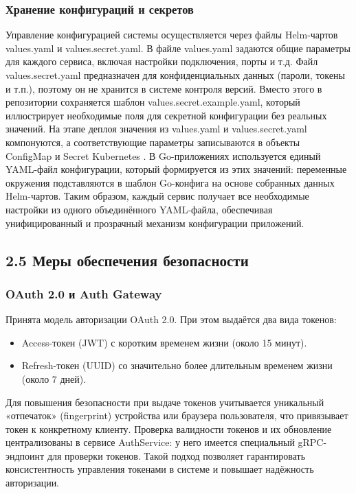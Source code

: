 \subsubsection*{Хранение конфигураций и секретов}
Управление конфигурацией системы осуществляется через файлы Helm-чартов values.yaml и values.secret.yaml. В файле values.yaml задаются общие параметры для каждого сервиса, включая настройки подключения, порты и т.д. Файл values.secret.yaml предназначен для конфиденциальных данных (пароли, токены и т.п.), поэтому он не хранится в системе контроля версий. Вместо этого в репозитории сохраняется шаблон values.secret.example.yaml, который иллюстрирует необходимые поля для секретной конфигурации без реальных значений. На этапе деплоя значения из values.yaml и values.secret.yaml компонуются, а соответствующие параметры записываются в объекты \\ ConfigMap и Secret Kubernetes \cite{3}\cite{4}. В Go-приложениях используется единый YAML-файл конфигурации, который формируется из этих значений: переменные окружения подставляются в шаблон Go-конфига на основе собранных данных Helm-чартов. Таким образом, каждый сервис получает все необходимые настройки из одного объединённого YAML-файла, обеспечивая унифицированный и прозрачный механизм конфигурации приложений.

\subsection*{2.5 Меры обеспечения безопасности}

\subsubsection*{OAuth 2.0 и Auth Gateway}
Принята модель авторизации OAuth 2.0. При этом выдаётся два вида токенов:
\begin{itemize}
    \item Access-токен (JWT) \cite{7} с коротким временем жизни (около 15 минут).
    \item Refresh-токен (UUID) со значительно более длительным временем жизни (около 7 дней).
\end{itemize}
\noindent Для повышения безопасности при выдаче токенов учитывается уникальный «отпечаток» (fingerprint) устройства или браузера пользователя, что привязывает токен к конкретному клиенту. Проверка валидности токенов и их обновление централизованы в сервисе AuthService: у него имеется специальный gRPC-эндпоинт для проверки токенов. Такой подход позволяет гарантировать консистентность управления токенами в системе и повышает надёжность авторизации.

